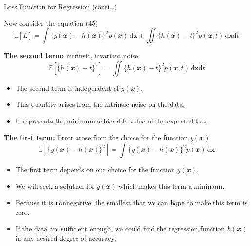 \documentclass{bredelebeamer}
\begin{document}
\begin{frame}{Loss Function for Regression (conti\ldots)}
  \begin{justify}
    Now consider the equation (45)
    $$
    \mathbb{E}[L]
    = \int {\{y(\mathbfit{x}) - h(\mathbfit{x})\}}^2 p(\mathbfit{x}) \, \mathrm{d}\mathbf{x}
    + \iint {\{h(\mathbfit{x}) - t\}}^2 p(\mathbfit{x}, t) \, \mathrm{d}\mathbf{x} \mathrm{d}t
    $$

    \vspace{0.5\baselineskip}
    \textbf{The second term:} intrinsic, invariant noise\\
    $$
    \mathbb{E}[{\{h(\mathbfit{x})-t\}}^2]
    = \iint {\{h(\mathbfit{x}) - t\}}^2 p(\mathbfit{x}, t) \, \mathrm{d}\mathbf{x} \mathrm{d}t
    $$
    \begin{itemize}
      \item The second term is independent of $y(\mathbfit{x})$.
      \item This quantity arises from the intrinsic noise on the data.
      \item It represents the minimum achievable value of the expected loss.
    \end{itemize}

    \vspace{0.5\baselineskip}
    \textbf{The first term:} Error arose from the choice for the function $y(\mathbfit{x})$\\
    $$
    \mathbb{E}[{\{y(\mathbfit{x})-h(\mathbfit{x})\}}^2]
    = \int {\{y(\mathbfit{x}) - h(\mathbfit{x})\}}^2 p(\mathbfit{x}) \, \mathrm{d}\mathbf{x}
    $$
    \begin{itemize}
      \item The first term depends on our choice for the function $y(\mathbfit{x})$.
      \item We will seek a solution for $y(\mathbfit{x})$ which makes this term a minimum.
      \item Because it is nonnegative, the smallest that we can hope to make this term is zero.
      \item If the data are sufficient enough, we could find the regression function
            $h(\mathbfit{x})$ in any desired degree of accuracy.
    \end{itemize}
  \end{justify}
\end{frame}
\end{document}

